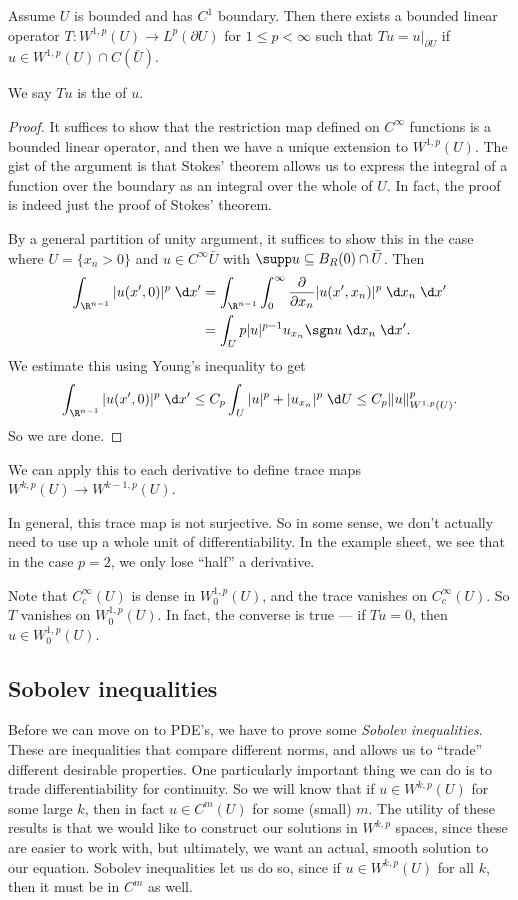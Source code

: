 \documentclass[a4paper]{article}
\begin{document}
\begin{thm}
  Assume $U$ is bounded and has $C^1$ boundary. Then there exists a bounded linear operator $T: W^{1, p}(U) \to L^p(\partial U)$ for $1 \leq p < \infty$ such that $Tu = u|_{\partial U}$ if $u \in W^{1, p}(U) \cap C(\bar{U})$.
\end{thm}
We say $Tu$ is the  of $u$.

\begin{proof}
  It suffices to show that the restriction map defined on $C^\infty$ functions is a bounded linear operator, and then we have a unique extension to $W^{1, p}(U)$. The gist of the argument is that Stokes' theorem allows us to express the integral of a function over the boundary as an integral over the whole of $U$. In fact, the proof is indeed just the proof of Stokes' theorem.

  By a general partition of unity argument, it suffices to show this in the case where $U = \{x_n > 0\}$ and $u \in C^\infty{\bar{U}}$ with $\supp u \subseteq B_R(0) \cap \bar{U}$. Then
  \begin{align*}
    \int_{\R^{n - 1}} |u(x', 0)|^p \;\d x' &= \int_{\R^{n - 1}} \int_0^\infty \frac{\partial}{\partial x_n} |u(x', x_n)|^p \;\d x_n \;\d x' \\
    &= \int_U p |u|^{p - 1} u_{x_n} \sgn u \;\d x_n \;\d x'.
  \end{align*}
  We estimate this using Young's inequality to get
  \[
    \int_{\R^{n - 1}} |u(x', 0)|^p \;\d x' \leq C_p \int_U |u|^p + |u_{x_n}|^p \;\d U \leq C_p \|u\|_{W^{1, p}(U)}^p.
  \]
  So we are done.
\end{proof}
We can apply this to each derivative to define trace maps $W^{k, p}(U) \to W^{k - 1, p}(U)$.

In general, this trace map is not surjective. So in some sense, we don't actually need to use up a whole unit of differentiability. In the example sheet, we see that in the case $p = 2$, we only lose ``half'' a derivative.

Note that $C_c^\infty(U)$ is dense in $W_0^{1, p}(U)$, and the trace vanishes on $C_c^\infty(U)$. So $T$ vanishes on $W_0^{1, p}(U)$. In fact, the converse is true --- if $Tu = 0$, then $u \in W_0^{1, p}(U)$.

\subsection{Sobolev inequalities}
Before we can move on to PDE's, we have to prove some \emph{Sobolev inequalities}. These are inequalities that compare different norms, and allows us to ``trade'' different desirable properties. One particularly important thing we can do is to trade differentiability for continuity. So we will know that if $u \in W^{k, p}(U)$ for some large $k$, then in fact $u \in C^m(U)$ for some (small) $m$. The utility of these results is that we would like to construct our solutions in $W^{k, p}$ spaces, since these are easier to work with, but ultimately, we want an actual, smooth solution to our equation. Sobolev inequalities let us do so, since if $u \in W^{k, p}(U)$ for all $k$, then it must be in $C^m$ as well.
\end{document}
